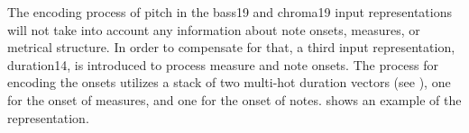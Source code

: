 
The encoding process of pitch in the \gls{bass19} and
\gls{chroma19} input representations will not take into
account any information about note onsets, measures, or
metrical structure. In order to compensate for that, a third
input representation, \gls{duration14}, is introduced to
process measure and note onsets. The process for encoding
the onsets utilizes a stack of two multi-hot duration
vectors (see ), one for the
onset of measures, and one for the onset of notes.
 shows an example of the
representation.


